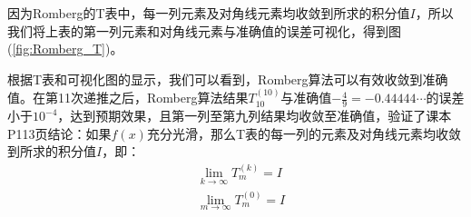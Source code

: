 
因为Romberg的T表中，每一列元素及对角线元素均收敛到所求的积分值$I$，所以我们将上表的第一列元素和对角线元素与准确值的误差可视化，得到图(\ref{fig:Romberg_T})。

根据T表和可视化图的显示，我们可以看到，Romberg算法可以有效收敛到准确值。在第11次递推之后，Romberg算法结果$T_{10}^{(10)}$与准确值$-\frac{4}{9}=-0.44444\cdots$的误差小于$10^{-4}$，达到预期效果，且第一列至第九列结果均收敛至准确值，验证了课本P113页结论：如果$f(x)$充分光滑，那么T表的每一列的元素及对角线元素均收敛到所求的积分值$I$，即：
\begin{equation*}
    \begin{aligned}
        & \lim_{k\rightarrow \infty} T_m^{(k)} = I \\    
        & \lim_{m\rightarrow \infty} T_m^{(0)} = I   
    \end{aligned}
\end{equation*}

